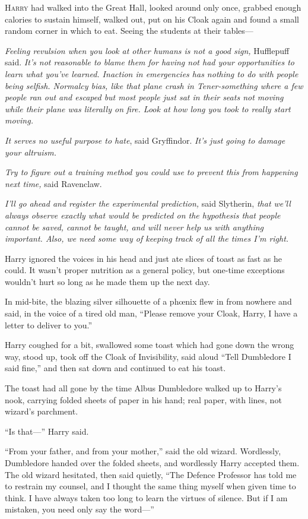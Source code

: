 
\lettrine{H}{arry} had walked into the Great Hall, looked around only once, grabbed enough calories to sustain himself, walked out, put on his Cloak again and found a small random corner in which to eat. Seeing the students at their tables—

\emph{Feeling revulsion when you look at other humans is not a good sign,} Hufflepuff said. \emph{It’s not reasonable to blame them for having not had your opportunities to learn what you’ve learned. Inaction in emergencies has nothing to do with people being selfish. Normalcy bias, like that plane crash in Tener-something where a few people ran out and escaped but most people just sat in their seats not moving while their plane was literally on fire. Look at how long \emph{you} took to really start moving.}

\emph{It serves no useful purpose to hate}, said Gryffindor. \emph{It’s just going to damage your altruism.}

\emph{Try to figure out a training method you could use to prevent this from happening next time,} said Ravenclaw.

\emph{I’ll go ahead and register the experimental prediction,} said Slytherin, \emph{that we’ll always observe exactly what would be predicted on the hypothesis that people cannot be saved, cannot be taught, and will never help us with anything important. Also, we need some way of keeping track of all the times I’m right.}

Harry ignored the voices in his head and just ate slices of toast as fast as he could. It wasn’t proper nutrition as a general policy, but one-time exceptions wouldn’t hurt so long as he made them up the next day.

In mid-bite, the blazing silver silhouette of a phœnix flew in from nowhere and said, in the voice of a tired old man, “Please remove your Cloak, Harry, I have a letter to deliver to you.”

Harry coughed for a bit, swallowed some toast which had gone down the wrong way, stood up, took off the Cloak of Invisibility, said aloud “Tell Dumbledore I said fine,” and then sat down and continued to eat his toast.

The toast had all gone by the time Albus Dumbledore walked up to Harry’s nook, carrying folded sheets of paper in his hand; real paper, with lines, not wizard’s parchment.

“Is that—” Harry said.

“From your father, and from your mother,” said the old wizard. Wordlessly, Dumbledore handed over the folded sheets, and wordlessly Harry accepted them. The old wizard hesitated, then said quietly, “The Defence Professor has told me to restrain my counsel, and I thought the same thing myself when given time to think. I have always taken too long to learn the virtues of silence. But if I am mistaken, you need only say the word—”

